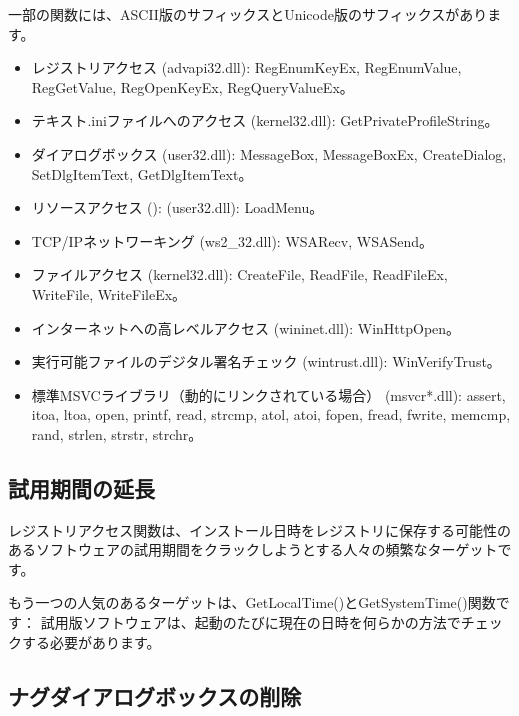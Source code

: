 一部の関数には、ASCII版のサフィックスとUnicode版のサフィックスがあります。

\begin{itemize}

\item
レジストリアクセス (advapi32.dll): 
RegEnumKeyEx, RegEnumValue, RegGetValue, RegOpenKeyEx, RegQueryValueEx。

\item
テキスト.iniファイルへのアクセス (kernel32.dll): 
GetPrivateProfileString。

\item
ダイアログボックス (user32.dll): 
MessageBox, MessageBoxEx, CreateDialog, SetDlgItemText, GetDlgItemText。

\item
リソースアクセス (): (user32.dll): LoadMenu。

\item
TCP/IPネットワーキング (ws2\_32.dll):
WSARecv, WSASend。

\item
ファイルアクセス (kernel32.dll):
CreateFile, ReadFile, ReadFileEx, WriteFile, WriteFileEx。

\item
インターネットへの高レベルアクセス (wininet.dll): WinHttpOpen。

\item
実行可能ファイルのデジタル署名チェック (wintrust.dll):
WinVerifyTrust。

\item
標準MSVCライブラリ（動的にリンクされている場合） (msvcr*.dll):
assert, itoa, ltoa, open, printf, read, strcmp, atol, atoi, fopen, fread, fwrite, memcmp, rand,
strlen, strstr, strchr。

\end{itemize}

\subsection{試用期間の延長}

レジストリアクセス関数は、インストール日時をレジストリに保存する可能性のあるソフトウェアの試用期間をクラックしようとする人々の頻繁なターゲットです。

もう一つの人気のあるターゲットは、GetLocalTime()とGetSystemTime()関数です：
試用版ソフトウェアは、起動のたびに現在の日時を何らかの方法でチェックする必要があります。

\subsection{ナグダイアログボックスの削除}

